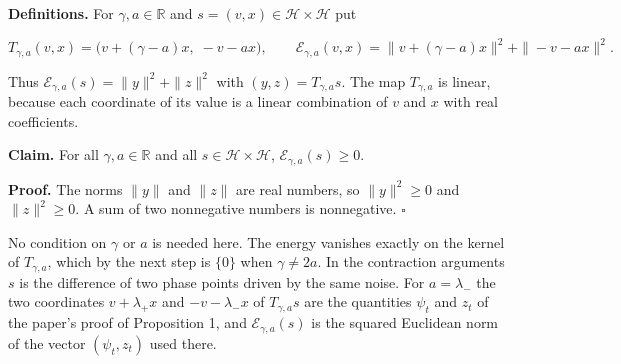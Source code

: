 \documentclass[11pt,a4paper]{article}
\begin{document}
\textbf{Definitions.} For \(\gamma,a\in\mathbb R\) and \(s=(v,x)\in \mathcal H\times \mathcal H\) put


\[T_{\gamma,a}(v,x)=\bigl(v+(\gamma-a)x,\;-v-ax\bigr),\qquad \mathcal E_{\gamma,a}(v,x)=\|v+(\gamma-a)x\|^2+\|-v-ax\|^2 .\]


Thus \(\mathcal E_{\gamma,a}(s)=\|y\|^2+\|z\|^2\) with \((y,z)=T_{\gamma,a}s\). The map \(T_{\gamma,a}\) is linear, because each coordinate of its value is a linear combination of \(v\) and \(x\) with real coefficients.




\textbf{Claim.} For all \(\gamma,a\in\mathbb R\) and all \(s\in \mathcal H\times \mathcal H\), \(\mathcal E_{\gamma,a}(s)\ge0\).




\textbf{Proof.} The norms \(\|y\|\) and \(\|z\|\) are real numbers, so \(\|y\|^2\ge0\) and \(\|z\|^2\ge0\). A sum of two nonnegative numbers is nonnegative. \(\square\)




No condition on \(\gamma\) or \(a\) is needed here. The energy vanishes exactly on the kernel of \(T_{\gamma,a}\), which by the next step is \(\{0\}\) when \(\gamma\neq2a\). In the contraction arguments \(s\) is the difference of two phase points driven by the same noise. For \(a=\lambda_-\) the two coordinates \(v+\lambda_+x\) and \(-v-\lambda_-x\) of \(T_{\gamma,a}s\) are the quantities \(\psi_t\) and \(z_t\) of the paper's proof of Proposition 1, and \(\mathcal E_{\gamma,a}(s)\) is the squared Euclidean norm of the vector \((\psi_t,z_t)\) used there.
\end{document}
